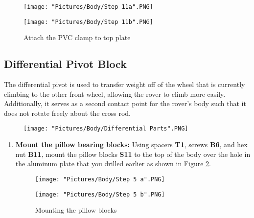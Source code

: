 \documentclass[12pt]{article}
\begin{document}
\begin{enumerate}
\begin{figure}[H]
  \centering
  \begin{minipage}[b]{0.40\textwidth}
    \texttt{[image: "Pictures/Body/Step 11a".PNG]}
  \end{minipage}
  \hfill
  \begin{minipage}[b]{0.50\textwidth}
    \texttt{[image: "Pictures/Body/Step 11b".PNG]}
  \end{minipage}
  \caption{Attach the PVC clamp to top plate}
	\label{pvc to top plate}
\end{figure}

\end{enumerate}


\subsection{Differential Pivot Block}
The differential pivot is used to transfer weight off of the wheel that is currently climbing to the other front wheel, allowing the rover to climb more easily. Additionally, it serves as a second contact point for the rover's body such that it does not rotate freely about the cross rod.

\begin{figure}[H]
	\centering
	\texttt{[image: "Pictures/Body/Differential Parts".PNG]}
\end{figure}

\begin{enumerate}
\item \textbf{Mount the pillow bearing blocks:} Using spacers \textbf{T1}, screws \textbf{B6}, and hex nut \textbf{B11}, mount the pillow blocks \textbf{S11} to the top of the body over the hole in the aluminum plate that you drilled earlier as shown in Figure \ref{mount pillow blocks}.

\begin{figure}[H]
  \centering
  \begin{minipage}[b]{0.30\textwidth}
    \texttt{[image: "Pictures/Body/Step 5 a".PNG]}
  \end{minipage}
  \hfill
  \begin{minipage}[b]{0.55\textwidth}
    \texttt{[image: "Pictures/Body/Step 5 b".PNG]}
  \end{minipage}
  \caption{Mounting the pillow blocks}
  \label{mount pillow blocks}
\end{figure}


\end{enumerate}
\end{document}
